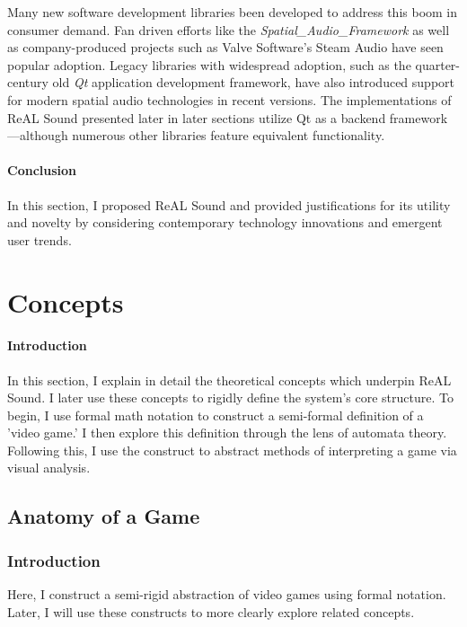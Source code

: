 \documentclass{report}
\newcommand{\rs}{ReAL Sound\xspace}
\begin{document}
Many new software development libraries been developed to address this boom in consumer demand. Fan driven efforts like the \emph{Spatial\_Audio\_Framework}\cite{McCormack2024} as well as company-produced projects such as Valve Software's Steam Audio\cite{Valve} have seen popular adoption. Legacy libraries with widespread adoption, such as the quarter-century old \emph{Qt} application development framework\cite{QTProgramming}, have also introduced support for modern spatial audio technologies in recent versions\cite{QTSpatial}. The implementations of \rs presented later in later sections utilize Qt as a backend framework---although numerous other libraries feature equivalent functionality. 

\paragraph{Conclusion}
In this section, I proposed \rs and provided justifications for its utility and novelty by considering contemporary technology innovations and emergent user trends. 





\section{Concepts}
\paragraph{Introduction} 
In this section, I explain in detail the theoretical concepts which underpin \rs. I later use these concepts to rigidly define the system's core structure. To begin, I use formal math notation to construct a semi-formal definition of a 'video game.' I then explore this definition through the lens of automata theory. Following this, I use the construct to abstract methods of interpreting a game via visual analysis. 


\subsection{Anatomy of a Game}
\subsubsection{Introduction}
Here, I construct a semi-rigid abstraction of video games using formal notation. Later, I will use these constructs to more clearly explore related concepts.
\end{document}
